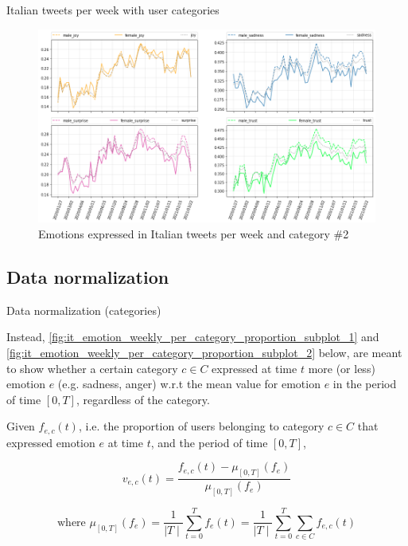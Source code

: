 \documentclass[8pt]{beamer}  %
\begin{document}
\begin{frame}{Italian tweets per week with user categories} 
	
	\begin{figure}[h]
    	\includegraphics[scale=.30]{assets/img/it_emotions_per_category_wrt_total_subplots_2.png}
    	\caption{Emotions expressed in Italian tweets per week and category \#2}
    	\label{fig:it_emotion_weekly_per_category_subplot_2}
    \end{figure}
	
\end{frame}

\subsection{Data normalization}

\begin{frame}{Data normalization (categories)}
	
	Instead, \cref{fig:it_emotion_weekly_per_category_proportion_subplot_1} and \cref{fig:it_emotion_weekly_per_category_proportion_subplot_2} below, are meant to show whether a certain category \(c \in C\) expressed at time \(t\) more (or less) emotion \(e\) (e.g. sadness, anger) w.r.t the mean value for emotion \(e\) in the period of time \([0, T]\), regardless of the category.
	
	\begin{definition}
	    Given \(f_{e, c}(t)\), i.e. the proportion of users belonging to category \(c \in C\) that expressed emotion \(e\) at time \(t\), and the period of time \([0,T]\),
	    
	    \[v_{e, c}(t) = \frac{f_{e, c}(t) - \mu_{[0,T]}(f_e)}{\mu_{[0,T]}(f_e)}\]
	    
	    \[\text{where } \mu_{[0,T]}(f_e) = \frac{1}{\mid T \mid} \sum_{t =0}^{T} f_e(t) = \frac{1}{\mid T \mid} \sum_{t =0}^{T} \sum_{c \in C} f_{e, c}(t)\] 
	\end{definition}
	
\end{frame}
\end{document}
